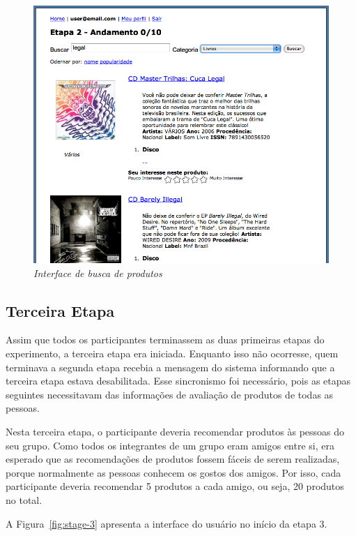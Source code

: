 \begin{figure}[htp]
  \centering
  \includegraphics[width=\textwidth]{imagens/search}
  \caption{\it Interface de busca de produtos}
  \label{fig:product-search}
\end{figure}

\subsection{Terceira Etapa}

Assim que todos os participantes terminassem as duas primeiras etapas do experimento, a terceira etapa era iniciada. Enquanto isso não ocorresse, quem terminava a segunda etapa recebia a mensagem do sistema informando que a terceira etapa estava desabilitada. Esse sincronismo foi necessário, pois as etapas seguintes necessitavam das informações de avaliação de produtos de todas as pessoas.

Nesta terceira etapa, o participante deveria recomendar produtos às pessoas do seu grupo. Como todos os integrantes de um grupo eram amigos entre si, era esperado que as recomendações de produtos fossem fáceis de serem realizadas, porque normalmente as pessoas conhecem os gostos dos amigos. Por isso, cada participante deveria recomendar 5 produtos a cada amigo, ou seja, 20 produtos no total.

A Figura~\ref{fig:stage-3} apresenta a interface do usuário no início da etapa 3.

